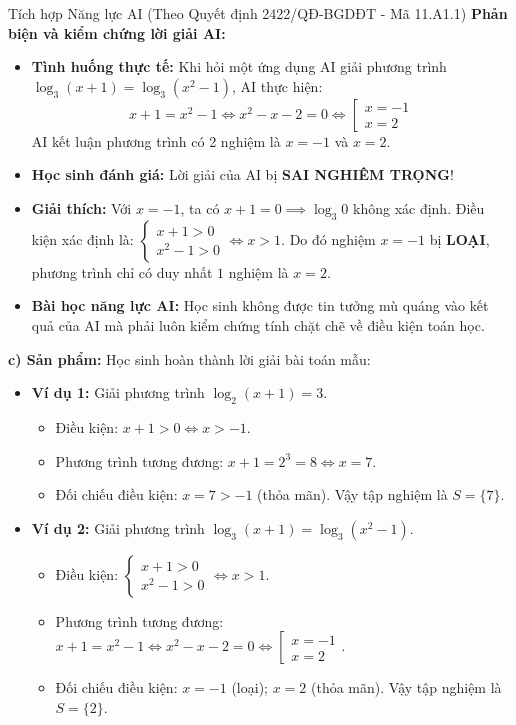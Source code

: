 \documentclass[12pt, a4paper]{article}
\begin{document}
\begin{aibox}{Tích hợp Năng lực AI (Theo Quyết định 2422/QĐ-BGDĐT - Mã 11.A1.1)}
\textbf{Phản biện và kiểm chứng lời giải AI:}
\begin{itemize}[leftmargin=0.6cm]
    \item \textbf{Tình huống thực tế:} Khi hỏi một ứng dụng AI giải phương trình $\log_3(x + 1) = \log_3(x^2 - 1)$, AI thực hiện:
    $$x + 1 = x^2 - 1 \iff x^2 - x - 2 = 0 \iff \left[\begin{array}{l} x = -1 \\ x = 2 \end{array}\right.$$
    AI kết luận phương trình có 2 nghiệm là $x = -1$ và $x = 2$.
    \item \textbf{Học sinh đánh giá:} Lời giải của AI bị \textbf{SAI NGHIÊM TRỌNG}!
    \item \textbf{Giải thích:} Với $x = -1$, ta có $x + 1 = 0 \implies \log_3 0$ không xác định.
    Điều kiện xác định là: $\begin{cases} x + 1 > 0 \\ x^2 - 1 > 0 \end{cases} \iff x > 1$. Do đó nghiệm $x = -1$ bị \textbf{LOẠI}, phương trình chỉ có duy nhất $1$ nghiệm là $x = 2$.
    \item \textbf{Bài học năng lực AI:} Học sinh không được tin tưởng mù quáng vào kết quả của AI mà phải luôn kiểm chứng tính chặt chẽ về điều kiện toán học.
\end{itemize}
\end{aibox}

\noindent \textbf{c) Sản phẩm:}
Học sinh hoàn thành lời giải bài toán mẫu:
\begin{itemize}
    \item \textbf{Ví dụ 1:} Giải phương trình $\log_2 (x + 1) = 3$.
    \begin{itemize}
        \item Điều kiện: $x + 1 > 0 \iff x > -1$.
        \item Phương trình tương đương: $x + 1 = 2^3 = 8 \iff x = 7$.
        \item Đối chiếu điều kiện: $x = 7 > -1$ (thỏa mãn). Vậy tập nghiệm là $S = \{7\}$.
    \end{itemize}
    \item \textbf{Ví dụ 2:} Giải phương trình $\log_3 (x + 1) = \log_3 (x^2 - 1)$.
    \begin{itemize}
        \item Điều kiện: $\begin{cases} x + 1 > 0 \\ x^2 - 1 > 0 \end{cases} \iff x > 1$.
        \item Phương trình tương đương: $x + 1 = x^2 - 1 \iff x^2 - x - 2 = 0 \iff \left[\begin{array}{l} x = -1 \\ x = 2 \end{array}\right.$.
        \item Đối chiếu điều kiện: $x = -1$ (loại); $x = 2$ (thỏa mãn). Vậy tập nghiệm là $S = \{2\}$.
    \end{itemize}
\end{itemize}
\end{document}
